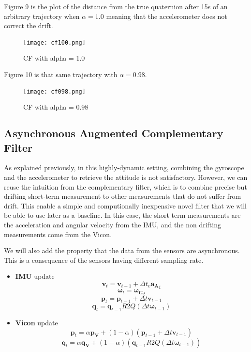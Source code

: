 \documentclass[12pt,]{article}
\begin{document}
Figure 9 is the plot of the distance from the true quaternion after 15s
of an arbitrary trajectory when \(\alpha = 1.0\) meaning that the
accelerometer does not correct the drift.

\begin{figure}
\centering
\texttt{[image: cf100.png]}
\caption{CF with alpha = 1.0}
\end{figure}

Figure 10 is that same trajectory with \(\alpha = 0.98\).

\begin{figure}
\centering
\texttt{[image: cf098.png]}
\caption{CF with alpha = 0.98}
\end{figure}

\subsection{Asynchronous Augmented Complementary
Filter}\label{asynchronous-augmented-complementary-filter}

As explained previously, in this highly-dynamic setting, combining the
gyroscope and the accelerometer to retrieve the attitude is not
satisfactory. However, we can reuse the intuition from the complementary
filter, which is to combine precise but drifting short-term measurement
to other measurements that do not suffer from drift. This enable a
simple and computionally inexpensive novel filter that we will be able
to use later as a baseline. In this case, the short-term measurements
are the acceleration and angular velocity from the IMU, and the non
drifting measurements come from the Vicon.

We will also add the property that the data from the sensors are
asynchronous. This is a consequence of the sensors having different
sampling rate.

\begin{itemize}
\item
  \textbf{IMU} update
  \[\mathbf{v}_t = \mathbf{v}_{t-1} + \Delta t_v \mathbf{a_A}_t\]
  \[\boldsymbol{\omega}_t = \boldsymbol{\mathbf{\omega_G}}_t\]
  \[\mathbf{p}_t = \mathbf{p}_{t-1} + \Delta t \mathbf{v}_{t-1}\]
  \[\mathbf{q}_t = \mathbf{q}_{t-1}R2Q(\Delta t \boldsymbol{\omega}_{t-1})\]
\item
  \textbf{Vicon} update
  \[\mathbf{p}_t = \alpha \mathbf{p_V} + (1 - \alpha) (\mathbf{p}_{t-1} + \Delta t \mathbf{v}_{t-1})\]
  \[\mathbf{q}_t = \alpha \mathbf{q_V} + (1 - \alpha) (\mathbf{q}_{t-1}R2Q(\Delta t \boldsymbol{\omega}_{t-1}))\]
\end{itemize}
\end{document}
